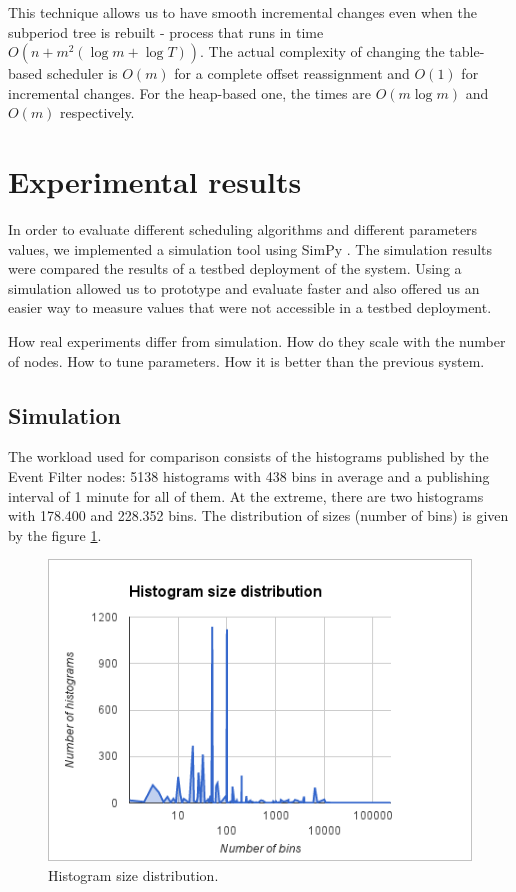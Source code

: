 This technique allows us to have smooth incremental changes even when the subperiod tree is rebuilt - process that runs in time $O(n+m^2(\log m+\log T))$. The actual complexity of changing the table-based scheduler is $O(m)$ for a complete offset reassignment and $O(1)$ for incremental changes. For the heap-based one, the times are $O(m\log m)$ and $O(m)$ respectively.

\section*{Experimental results}

In order to evaluate different scheduling algorithms and different parameters values, we implemented a simulation tool using SimPy \citep{simpy}. The simulation results were compared the results of a testbed deployment of the system. Using a simulation allowed us to prototype and evaluate faster and also offered us an easier way to measure values that were not accessible in a testbed deployment.

How real experiments differ from simulation.
How do they scale with the number of nodes.
How to tune parameters.
How it is better than the previous system.

\subsection*{Simulation}
The workload used for comparison consists of the histograms published by the Event Filter nodes: 5138 histograms with 438 bins in average and a publishing interval of 1 minute for all of them. At the extreme, there are two histograms with 178.400 and 228.352 bins. The distribution of sizes (number of bins) is given by the figure \ref{fig:histosize}.

\begin{figure}[ht]
\centering
\includegraphics[scale=0.6]{Images/histo_distrib.png}
\caption{Histogram size distribution.}
\label{fig:histosize}
\end{figure}


